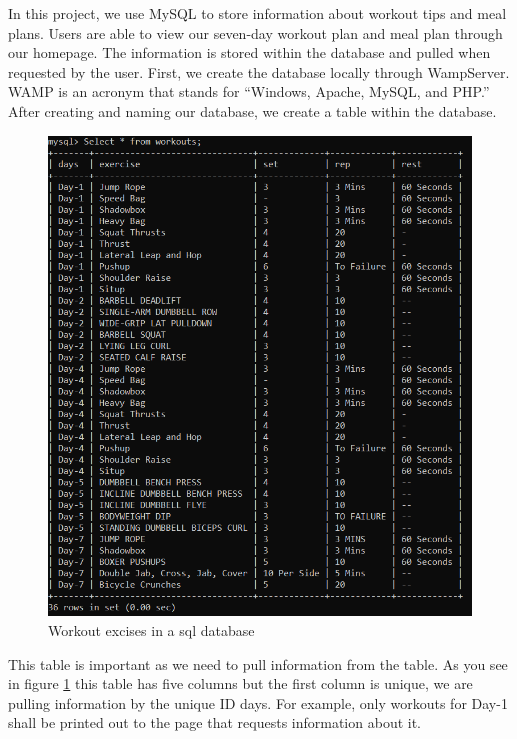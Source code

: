 \documentclass[a4paper,12pt]{report}
\begin{document}
In this project, we use MySQL to store information about workout tips and meal plans. Users are able to view our seven-day workout plan and meal plan through our homepage. The information is stored within the database and pulled when requested by the user.
First, we create the database locally through WampServer. WAMP is an acronym that stands for “Windows, Apache, MySQL, and PHP.” After creating and naming our database, we create a table within the database. 

\begin{figure}[h]
    \begin{center}
    \includegraphics[scale=.47]{images/workouts-table.PNG}
    \caption{Workout excises in a sql database}
    \label{fig:MYSQL}
    \end{center}
\end{figure}

This table is important as we need to pull information from the table. As you see in figure \ref{fig:MYSQL} this table has five columns but the first column is unique, we are pulling information by the unique ID days. For example, only workouts for Day-1 shall be printed out to the page that requests information about it.
\end{document}
